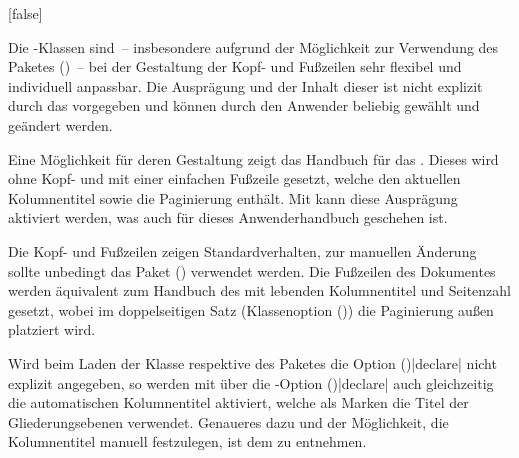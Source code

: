 \begin{Declaration*}{}
\begin{Declaration*}{}
\begin{Declaration*}{}
\begin{Declaration}[%
  v2.03!\Option{cdfoot=color}:farbiger Hintergrund der Fußzeile;%
  v2.03!\Option{cdfoot=\PValueName{Höhe}};%
]{}[false]%
\printdeclarationlist%
%
%
%

Die \TUDScript-Klassen sind~-- insbesondere aufgrund der Möglichkeit zur 
Verwendung des Paketes ()~-- bei 
der Gestaltung der Kopf- und Fußzeilen sehr flexibel und individuell anpassbar. 
Die Ausprägung und der Inhalt dieser ist nicht explizit durch das \CD 
vorgegeben und können durch den Anwender beliebig gewählt und geändert werden. 

Eine Möglichkeit für deren Gestaltung zeigt das Handbuch für das \TUDCD. Dieses 
wird ohne Kopf- und mit einer einfachen Fußzeile gesetzt, welche den aktuellen 
Kolumnentitel sowie die Paginierung enthält. Mit  kann diese 
Ausprägung aktiviert werden, was auch für dieses Anwenderhandbuch geschehen ist.
%
\begin{values}{}
\itemfalse
  Die Kopf- und Fußzeilen zeigen Standardverhalten, zur manuellen Änderung 
  sollte unbedingt das Paket () 
  verwendet werden.
\itemtrue*
  Die Fußzeilen des Dokumentes werden äquivalent zum Handbuch des \TUDCDs mit 
  lebenden Kolumnentitel und Seitenzahl gesetzt, wobei im doppelseitigen Satz 
  (Klassenoption ()) die Paginierung 
  außen platziert wird.
\end{values}
%
Wird beim Laden der Klasse respektive des Paketes  
die Option ()|declare| nicht 
explizit angegeben, so werden mit  über die 
\KOMAScript-Option ()|declare| auch 
gleichzeitig die automatischen Kolumnentitel aktiviert, welche als Marken die 
Titel der Gliederungsebenen verwendet. Genaueres dazu und der Möglichkeit, die 
Kolumnentitel manuell festzulegen, ist dem \scrguide zu entnehmen.


\end{Declaration}
\end{Declaration*}
\end{Declaration*}
\end{Declaration*}
